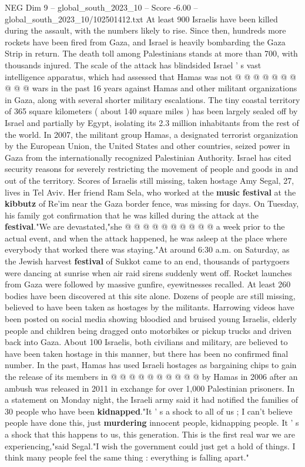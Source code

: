 \begin{textsample}{NEG Dim 9 – global\_south\_2023\_10 – Score -6.00 – global\_south\_2023\_10/102501412.txt}
At least 900 Israelis have been killed during the assault, with the numbers likely to rise.
Since then, hundreds more rockets have been fired from Gaza, and Israel is heavily bombarding the Gaza Strip in return.
The death toll among Palestinians stands at more than 700, with thousands injured.
The scale of the attack has blindsided Israel ' s vast intelligence apparatus, which had assessed that Hamas was not @ @ @ @ @ @ @ @ @ @ wars in the past 16 years against Hamas and other militant organizations in Gaza, along with several shorter military escalations.
The tiny coastal territory of 365 square kilometers ( about 140 square miles ) has been largely sealed off by Israel and partially by Egypt, isolating its 2.3 million inhabitants from the rest of the world.
In 2007, the militant group Hamas, a designated terrorist organization by the European Union, the United States and other countries, seized power in Gaza from the internationally recognized Palestinian Authority.
Israel has cited security reasons for severely restricting the movement of people and goods in and out of the territory.
Scores of Israelis still missing, taken hostage Amy Segal, 27, lives in Tel Aviv.
Her friend Ram Sela, who worked at the \textbf{music} \textbf{festival} at the \textbf{kibbutz} of Re'im near the Gaza border fence, was missing for days.
On Tuesday, his family got confirmation that he was killed during the attack at the \textbf{festival}."We are devastated,"she @ @ @ @ @ @ @ @ @ @ a week prior to the actual event, and when the attack happened, he was asleep at the place where everybody that worked there was staying."At around 6:30 a.m. on Saturday, as the Jewish harvest \textbf{festival} of Sukkot came to an end, thousands of partygoers were dancing at sunrise when air raid sirens suddenly went off.
Rocket launches from Gaza were followed by massive gunfire, eyewitnesses recalled.
At least 260 bodies have been discovered at this site alone.
Dozens of people are still missing, believed to have been taken as hostages by the militants.
Harrowing videos have been posted on social media showing bloodied and bruised young Israelis, elderly people and children being dragged onto motorbikes or pickup trucks and driven back into Gaza.
About 100 Israelis, both civilians and military, are believed to have been taken hostage in this manner, but there has been no confirmed final number.
In the past, Hamas has used Israeli hostages as bargaining chips to gain the release of its members in @ @ @ @ @ @ @ @ @ @ by Hamas in 2006 after an ambush was released in 2011 in exchange for over 1,000 Palestinian prisoners.
In a statement on Monday night, the Israeli army said it had notified the families of 30 people who have been \textbf{kidnapped}."It ' s a shock to all of us ; I can't believe people have done this, just \textbf{murdering} innocent people, kidnapping people.
It ' s a shock that this happens to us, this generation.
This is the first real war we are experiencing,"said Segal."I wish the government could just get a hold of things.
I think many people feel the same thing : everything is falling apart."

\end{textsample}
